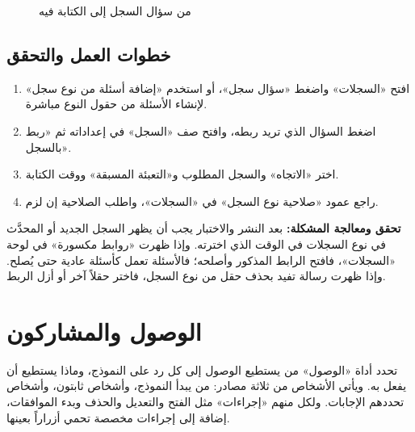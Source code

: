 \begin{figure}[H]
\centering
{}
\rclegend
\caption{من سؤال السجل إلى الكتابة فيه}
\label{fig:builder-forms-records-flow}
\end{figure}

\subsection{خطوات العمل والتحقق}
\begin{enumerate}
\item افتح «السجلات» واضغط «سؤال سجل»، أو استخدم «إضافة أسئلة من نوع سجل» لإنشاء الأسئلة من حقول النوع مباشرة.
\item اضغط السؤال الذي تريد ربطه، وافتح صف «السجل» في إعداداته ثم «ربط بالسجل».
\item اختر «الاتجاه» والسجل المطلوب و«التعبئة المسبقة» ووقت الكتابة.
\item راجع عمود «صلاحية نوع السجل» في «السجلات»، واطلب الصلاحية إن لزم.
\end{enumerate}

\textbf{تحقق ومعالجة المشكلة:} بعد النشر والاختبار يجب أن يظهر السجل الجديد أو المحدَّث في نوع السجلات في الوقت الذي اخترته. وإذا ظهرت «روابط مكسورة» في لوحة «السجلات»، فافتح الرابط المذكور وأصلحه؛ فالأسئلة تعمل كأسئلة عادية حتى يُصلح. وإذا ظهرت رسالة تفيد بحذف حقل من نوع السجل، فاختر حقلاً آخر أو أزل الربط.

\clearpage
\section{الوصول والمشاركون}
\label{sec:builder-feature-forms-access}

تحدد أداة «الوصول» من يستطيع الوصول إلى كل رد على النموذج، وماذا يستطيع أن يفعل به. ويأتي الأشخاص من ثلاثة مصادر: من يبدأ النموذج، وأشخاص ثابتون، وأشخاص تحددهم الإجابات. ولكل منهم «إجراءات» مثل الفتح والتعديل والحذف وبدء الموافقات، إضافة إلى إجراءات مخصصة تحمي أزراراً بعينها.

